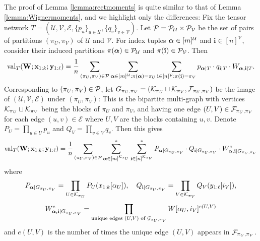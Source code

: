 \documentclass[10pt,reqno]{amsart}
\def\a{\alpha}
\def\x{\mathbf{x}}
\def\y{\mathbf{y}}
\def\W{\mathbf{W}}
\def\cU{\mathcal{U}}
\def\cV{\mathcal{V}}
\def\cE{\mathcal{E}}
\def\val{\operatorname{val}}
\def\bi{\mathbf{i}}
\begin{document}
The proof of Lemma \ref{lemma:rectmoments} is quite similar to that of Lemma
\ref{lemma:Wignermoments}, and we highlight only the differences: Fix the tensor
network $T=(\cU,\cV,\cE,\{p_u\}_{u \in \cU},\{q_v\}_{v \in \cV})$.
Let $\cP=\cP_\cU \times \cP_\cV$ be the set of pairs of partitions
$(\pi_U,\pi_V)$ of $\cU$ and $\cV$. For index
tuples $\balpha \in [m]^\cU$ and $\bi \in [n]^{\cV}$, consider their
induced partitions $\pi(\balpha) \in \cP_\cU$ and $\pi(\bi) \in \cP_\cV$. Then
\[\val_T(\W;\x_{1:k};\y_{1:\ell})
=\frac{1}{n}\sum_{(\pi_U,\pi_V) \in \cP}
\sum_{\balpha \in [m]^\cU:\pi(\balpha)=\pi_U}
\sum_{\bi \in [n]^{\cV}:\pi(\bi)=\pi_V} p_{\balpha|T} \cdot q_{\bi|T}
\cdot W_{\balpha,\bi|T}.\]
Corresponding to $(\pi_U,\pi_V) \in \mathcal{P}$,
let $G_{\pi_U,\pi_V}=(\mathcal{K}_{\pi_U} \sqcup \mathcal{K}_{\pi_V},\mathcal{F}_{\pi_U,\pi_V})$
be the image of $(\cU,\cV,\cE)$ under $(\pi_U,\pi_V)$: This is the bipartite
multi-graph with vertices $\mathcal{K}_{\pi_U} \sqcup
\mathcal{K}_{\pi_V}$ being the blocks of $\pi_U$ and $\pi_V$, and having one
edge $(U,V) \in \mathcal{F}_{\pi_U,\pi_V}$ for each edge $(u,v) \in \cE$ where $U,V$
are the blocks containing $u,v$. Denote
$P_U=\prod_{u \in U} p_u$ and $Q_V=\prod_{v \in V} q_v$. Then this gives
\begin{equation}\label{eq:rectval1}
\val_T(\W;\x_{1:k};\y_{1:\ell})
=\frac{1}{n}\sum_{(\pi_U,\pi_V) \in \cP}
\sum_{\balpha \in [m]^{\cK_{\pi_U}}}^* \sum_{\bi \in [n]^{\cK_{\pi_V}}}^*
P_{\balpha|G_{\pi_U,\pi_V}} \cdot Q_{\bi|G_{\pi_U,\pi_V}} \cdot
W_{\balpha,\bi|G_{\pi_U,\pi_V}}^e
\end{equation}
where
\[P_{\balpha|G_{\pi_U,\pi_V}}=\prod_{U \in \cK_{\pi_U}} P_U(x_{1:k}[\a_U]),
\quad Q_{\bi|G_{\pi_U,\pi_V}}=\prod_{V \in \cK_{\pi_V}} Q_V(y_{1:\ell}[i_V]),\]
\[W_{\balpha,\bi|G_{\pi_U,\pi_V}}^e=\prod_{\text{unique edges } (U,V) \text{ of
} \cG_{\pi_U,\pi_V}} W[\a_U,i_V]^{e(U,V)}\]
and $e(U,V)$ is the number of times the unique
edge $(U,V)$ appears in $\mathcal{F}_{\pi_U,\pi_V}$.
\end{document}
